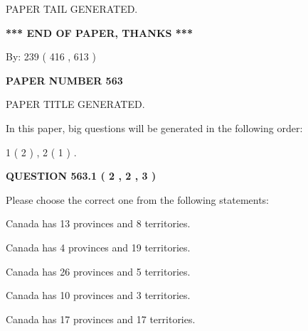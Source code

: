 \documentclass[12pt]{article}
\begin{document}
   
   
\vspace{2.0in} PAPER TAIL GENERATED.
   
   
   
   
\vspace{1.0in} 
{\textbf{\large{ *** END OF PAPER, THANKS *** }}} 
   
   
\hspace{1.0in} By: 
 239 ( 416 ,  613 )
   
   
   
   
\newpage 
\setcounter{page}{ 
   563001 } 
   
   
   
   
 {\textbf{ \Large{ PAPER NUMBER  563  }}}
   
   
\vspace{0.2in}
   
   
   
   
   
   
   
   
 \vspace{0.2in}
 
 
 
 
   
   
 PAPER TITLE GENERATED.
   
   
   
\vspace{0.2in}
   
In this paper, big questions will be generated in the following order: 
   
   
   1 ( 2 )
 ,
   2 ( 1 )
 .
  
\vspace{0.2in}
  
{\textbf{\Large{QUESTION
563.1 
 ( 2 , 2 , 3 )
}}}
  
  
Please choose the correct one from the following statements:
 
 
Canada has  13 provinces and  8 territories.
 
 
Canada has   4 provinces and  19 territories.
 
 
Canada has  26 provinces and  5 territories.
 
 
Canada has 10  provinces and 3 territories.
 
 
Canada has  17 provinces and  17 territories.
 
\end{document}
